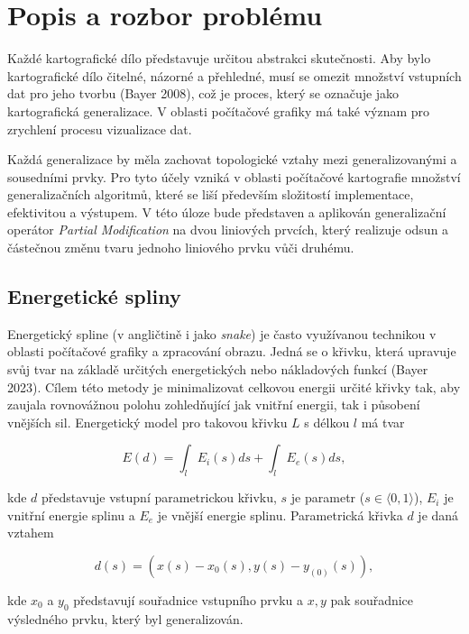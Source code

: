 \chapter*{Popis a rozbor problému}

\par Každé kartografické dílo představuje určitou abstrakci skutečnosti. Aby bylo kartografické dílo čitelné, názorné a přehledné, musí se omezit množství vstupních dat pro jeho tvorbu (Bayer 2008), což je proces, který se označuje jako kartografická generalizace. V oblasti počítačové grafiky má také význam pro zrychlení procesu vizualizace dat.
\par Každá generalizace by měla zachovat topologické vztahy mezi generalizovanými a sousedními prvky. Pro tyto účely vzniká v oblasti počítačové kartografie množství generalizačních algoritmů, které se liší především složitostí implementace, efektivitou a výstupem. V této úloze bude představen a aplikován generalizační operátor \emph{Partial Modification} na dvou liniových prvcích, který realizuje odsun a částečnou změnu tvaru jednoho liniového prvku vůči druhému. 

\section*{Energetické spliny}
\par Energetický spline (v angličtině i jako \emph{snake}) je často využívanou technikou v oblasti počítačové grafiky a zpracování obrazu. Jedná se o křivku, která upravuje svůj tvar na základě určitých energetických nebo nákladových funkcí (Bayer 2023). Cílem této metody je minimalizovat celkovou energii určité křivky tak, aby zaujala rovnovážnou polohu zohledňující jak vnitřní energii, tak i působení vnějších sil. Energetický model pro takovou křivku $L$ s délkou $l$ má tvar

\begin{equation*}
    E(d) = \int_{l}^{}E_i(s)ds + \int_{l}^{}E_e(s)ds,
\end{equation*}
\par kde $d$ představuje vstupní parametrickou křivku, $s$ je parametr ($s \in \langle 0, 1\rangle$), $E_i$ je vnitřní energie splinu a $E_e$ je vnější energie splinu. Parametrická křivka $d$ je daná vztahem

\begin{equation*}
    d(s) = (x(s) - x_0(s),y(s) - y_{(0)}(s)),
\end{equation*}
\par kde $x_0$ a $y_0$ představují souřadnice vstupního prvku a $x, y$ pak souřadnice výsledného prvku, který byl generalizován.

